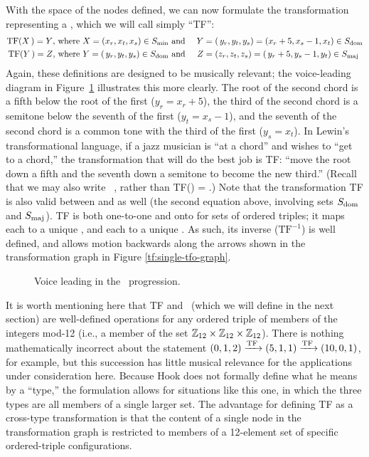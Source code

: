 With the space of the nodes defined, we can now formulate the transformation
representing a \tfo, which we will call simply ``TF'':
%
{\novspace%
\begin{alignat*}{3}
    \mathrm{TF}(X\,) = Y\text{, where}\ X = (x_r, x_t, x_s) \in S_{\mathrm{min}}
    & \text{ and}\ &
    Y &= (\,y_r, y_t, y_s) = (x_r + 5, x_s - 1, x_t) \in S_{\mathrm{dom}} \\
    \mathrm{TF}(Y\,) = Z\text{, where}\ Y = (\,y_r, y_t, y_s) \in S_{\mathrm{dom}}
    & \text{ and} &
    Z &= (z_r, z_t, z_s) = (\,y_r + 5, y_s - 1, y_t) \in S_{\mathrm{maj}}
\end{alignat*}}%
%
Again, these definitions are designed to be musically relevant; the
voice-leading diagram in Figure~\ref{tf:tfo-voice-leading} illustrates this
more clearly. The root of the second chord is a fifth below the root
of the first ($y_r = x_r + 5$), the third of the second chord is a semitone
below the seventh of the first ($y_t = x_s - 1$), and the seventh of the
second chord is a common tone with the third of the first ($y_s = x_t$). In
Lewin's transformational language, if a jazz musician is ``at a \ii
chord'' and wishes to ``get to a \V chord,'' the transformation that
will do the best job is TF: ``move the root down a fifth and the seventh down
a semitone to become the new third.'' (Recall that we may also write
\mbox{\ii \TFarrow\ \V}, rather than TF(\ii) = \V.) Note
that the transformation TF is also valid between \V and \I as
well (the second equation above, involving sets $S_{\mathrm{dom}}$ and $S_{\mathrm{maj}}$). TF is
both one-to-one and onto for sets of ordered triples; it maps each \ii
to a unique \V, and each \V to a unique \I. As such, its
inverse ($\mathrm{TF}^{-1}$) is well defined, and allows motion backwards
along the arrows shown in the transformation graph in Figure
\ref{tf:single-tfo-graph}.

\begin{figure}[htbp]
  \caption{Voice leading in the \tfo\ progression.}
  \label{tf:tfo-voice-leading}
\end{figure}

It is worth mentioning here that TF and \tft\ (which we will define in the
next section) are well-defined operations for any ordered triple of members of
the integers mod-12 (i.e., a member of the set $\mathbb{Z}_{12} \times \mathbb{Z}_{12}
\times \mathbb{Z}_{12}$). There is nothing mathematically incorrect
about the statement $(0, 1, 2) \xrightarrow{\mathrm{TF}\,} (5, 1, 1) \xrightarrow{\mathrm{TF}\,} (10, 0, 1)$, for
example, but this succession has little musical relevance for the applications
under consideration here. Because Hook does not formally define what he means
by a ``type,'' the formulation allows for situations like this one, in which
the three types are all members of a single larger set. The advantage
for defining TF as a cross-type transformation is that the content of a single
node in the transformation graph is restricted to members of a 12-element set
of specific ordered-triple configurations.

